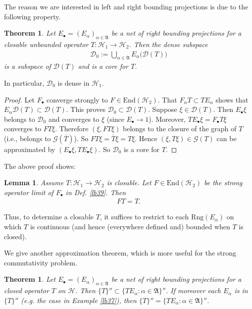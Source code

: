 \documentclass[12pt,b5paper,notitlepage]{article}
\theoremstyle{definition}
\theoremstyle{plain}
\newtheorem{thm}[df]{Theorem}
\newtheorem{lm}[df]{Lemma}
\newcommand{\fk}{\mathfrak}
\newcommand{\mc}{\mathcal}
\newcommand{\ovl}{\overline}
\newcommand{\End}{\mathrm{End}} %
\newcommand{\Dom}{\scr D}
\newcommand{\scr}{\mathscr}
\newcommand{\blt}{\bullet}
\newcommand{\Rng}{\mathrm{Rng}}
\numberwithin{equation}{section}
\begin{document}
The reason we are interested in left and right bounding projections is due to the following property.

\begin{thm}\label{lb44}
Let $E_\blt=(E_\alpha)_{\alpha\in\fk A}$ be a net of right bounding projections for a closable unbounded operator $T:\mc H_1\rightarrow\mc H_2$. Then the dense subspace
\begin{align*}
\Dom_0:=\bigcup_{\alpha\in\fk A}E_\alpha\big(\Dom(T)\big)
\end{align*}
is a subspace of $\Dom(T)$ and is a core for $T$. 
\end{thm}

In particular, $\Dom_0$ is dense in $\mc H_1$.


\begin{proof}
Let $F_\blt$ converge strongly to $F\in\End(\mc H_2)$. That $F_\alpha T\subset TE_\alpha$ shows that $E_\alpha\Dom(T)\subset\Dom(T)$. This proves $\Dom_0\subset\Dom(T)$. Suppose $\xi\in\Dom(T)$. Then $E_\blt\xi$ belongs to $\Dom_0$ and converges to $\xi$ (since $E_\blt\rightarrow 1$). Moreover, $TE_\blt\xi=F_\blt T\xi$ converges  to $FT\xi$. Therefore $(\xi,FT\xi)$ belongs to the closure of the graph of $T$ (i.e., belongs to $\scr G(\ovl T)$). So $FT\xi=\ovl T\xi=T\xi$. Hence $(\xi,T\xi)\in\scr G(T)$ can be approximated by $(E_\blt\xi,TE_\blt\xi)$. So $\Dom_0$ is a core for $T$.
\end{proof}

The above proof shows:

\begin{lm}\label{lb40}
Assume $T:\mc H_1\rightarrow\mc H_2$ is closable. Let $F\in\End(\mc H_2)$ be the strong operator limit of $F_\blt$ in Def. \ref{lb39}. Then
\begin{align}
FT=T.	
\end{align}
\end{lm}


Thus, to determine a closable $T$, it suffices to restrict to each $\Rng(E_\alpha)$ on which $T$ is continuous (and hence (everywhere defined and) bounded when $T$ is closed).


We give another approximation theorem, which is more useful for the strong commutativity problem.

\begin{thm}\label{lb41}
Let $E_\blt=(E_\alpha)_{\alpha\in\fk A}$ be a net of right bounding projections for a closed operator $T$ on $\mc H$. Then $\{T\}''\subset \{TE_\alpha:\alpha\in\fk A\}''$. If moreover each $E_\alpha$ is in $\{T\}''$ (e.g. the case in Example \ref{lb37}), then $\{T\}''=\{TE_\alpha:\alpha\in\fk A\}''$.
\end{thm}
\end{document}
